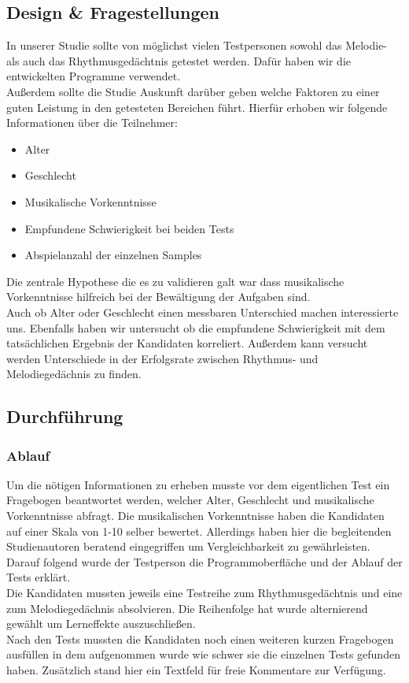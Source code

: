 \documentclass{acm_proc_article-sp}
\begin{document}
\subsection{Design \& Fragestellungen}
In unserer Studie sollte von möglichst vielen Testpersonen sowohl das Melodie- als auch das Rhythmusgedächtnis getestet werden. Dafür haben wir die entwickelten Programme verwendet.\\
Außerdem sollte die Studie Auskunft darüber geben welche Faktoren zu einer guten Leistung in den getesteten Bereichen führt. Hierfür erhoben wir folgende Informationen über die Teilnehmer:\\
\begin{itemize} 
\item Alter
\item Geschlecht
\item Musikalische Vorkenntnisse
\item Empfundene Schwierigkeit bei beiden Tests
\item Abspielanzahl der einzelnen Samples
\end{itemize}
Die zentrale Hypothese die es zu validieren galt war dass musikalische Vorkenntnisse hilfreich bei der Bewältigung der Aufgaben sind. \\
Auch ob Alter oder Geschlecht einen messbaren Unterschied machen interessierte uns. Ebenfalls haben wir untersucht ob die empfundene Schwierigkeit mit dem tatsächlichen Ergebnis der Kandidaten korreliert. 
Außerdem kann versucht werden Unterschiede in der Erfolgsrate zwischen Rhythmus- und Melodiegedächnis zu finden. 
\subsection{Durchführung}

\subsubsection{Ablauf}
Um die nötigen Informationen zu erheben musste vor dem eigentlichen Test ein Fragebogen beantwortet werden, welcher Alter, Geschlecht und musikalische Vorkenntnisse abfragt. Die musikalischen Vorkenntnisse haben die Kandidaten auf einer Skala von 1-10 selber bewertet. Allerdings haben hier die begleitenden Studienautoren beratend eingegriffen um Vergleichbarkeit zu gewährleisten.\\
Darauf folgend wurde der Testperson die Programmoberfläche und der Ablauf der Tests erklärt.\\ 
Die Kandidaten mussten jeweils eine Testreihe zum Rhythmusgedächtnis und eine zum Melodiegedächnis absolvieren. Die Reihenfolge hat wurde alternierend gewählt um Lerneffekte auszuschließen. \\
Nach den Tests mussten die Kandidaten noch einen weiteren kurzen Fragebogen ausfüllen in dem aufgenommen wurde wie schwer sie die einzelnen Tests gefunden haben. Zusätzlich stand hier ein Textfeld für freie Kommentare zur Verfügung. 
\end{document}
